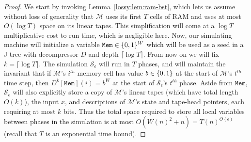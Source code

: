 \begin{proof}
We start by invoking Lemma~\ref{lossy:lem:ram-bst}, which lets us assume without loss of generality that $\mathcal{M}$ uses its first $T$ cells of RAM and uses at most $O(\log T)$ space on its linear tapes. This simplification will come at a $\log T$ multiplicative cost to run time, which is negligible here. Now, our simulating machine will initialize a variable $\mathtt{Mem} \in \{0,1\}^W$ which will be used as a seed in a J-tree with decompressor $D$ and depth $\lceil \log T \rceil$. From now on we will fix $k = \lceil \log T \rceil$. The simulation $\mathcal{S}_{\epsilon}$ will run in $T$ phases, and will maintain the invariant that if $\mathcal{M}$'s $i^{th}$ memory cell has value $b \in \{0,1\}$ at the start of $\mathcal{M}$'s $t^{th}$ time step, then $D^k[\mathtt{Mem}](i) = b^W$ at the start of $\mathcal{S}_{\epsilon}$'s $t^{th}$ phase. Aside from $\mathtt{Mem}$, $\mathcal{S}_{\epsilon}$ will also explicitly store a copy of $\mathcal{M}$'s linear tapes (which have total length $O(k)$), the input $x$, and descriptions of $\mathcal{M}$'s state and tape-head pointers, each requiring at most $k$ bits. Thus the total space required to store all local variables between phases in the simulation is at most $O(W(n)^2 + n) = T(n)^{O(\epsilon)}$ (recall that $T$ is an exponential time bound).


\end{proof}

